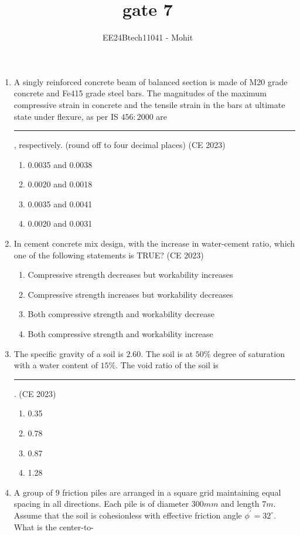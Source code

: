 \documentclass[journal,12pt,onecolumn]{IEEEtran}
\theoremstyle{remark}
\begin{document}
\title{gate 7}
\author{EE24Btech11041 - Mohit}
\maketitle
\renewcommand{\thefigure}{\theenumi}
\renewcommand{\thetable}{\theenumi}


\begin{enumerate}
\item A singly reinforced concrete beam of balanced section is made of M20 grade concrete and Fe415 grade steel bars. The magnitudes of the maximum compressive strain in concrete and the tensile strain in the bars at ultimate state under flexure, as per IS $456: 2000$ are \rule{2cm}{0.4pt}, respectively. (round off to four decimal places)
\hfill{(CE 2023)}
\begin{enumerate}
\item 0.0035 and 0.0038
\item 0.0020 and 0.0018
\item 0.0035 and 0.0041
\item 0.0020 and 0.0031
\end{enumerate}
\item In cement concrete mix design, with the increase in water-cement ratio, which one of the following statements is TRUE?
\hfill{(CE 2023)}
\begin{enumerate}
\item Compressive strength decreases but workability increases
\item Compressive strength increases but workability decreases
\item Both compressive strength and workability decrease
\item Both compressive strength and workability increase
\end{enumerate}
\item The specific gravity of a soil is $2.60$. The soil is at $50 \%$ degree of saturation with a
water content of $15 \%$. The void ratio of the soil is \rule{2cm}{0.4pt}.
\hfill{(CE 2023)}
\begin{enumerate}
\item 0.35
\item 0.78
\item 0.87
\item 1.28
\end{enumerate}
\item A group of $9$ friction piles are arranged in a square grid maintaining equal spacing in all directions. Each pile is of diameter $300 mm$ and length $7 m$. Assume that the soil is cohesionless with effective friction angle $\phi^{'} = 32^{\circ}$. What is the center-to-

\end{enumerate}
\end{document}
